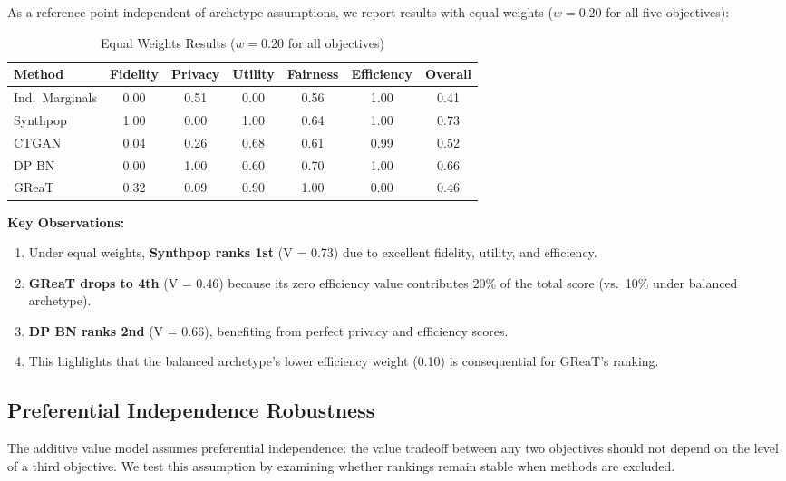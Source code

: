 \documentclass[12pt,a4paper]{article}
\begin{document}
As a reference point independent of archetype assumptions, we report results with equal weights ($w = 0.20$ for all five objectives):

\begin{table}[htbp]
\centering
\caption{Equal Weights Results ($w = 0.20$ for all objectives)}
\label{tab:equal_weights}
\begin{tabular}{@{}lcccccc@{}}
\toprule
\textbf{Method} & \textbf{Fidelity} & \textbf{Privacy} & \textbf{Utility} & \textbf{Fairness} & \textbf{Efficiency} & \textbf{Overall} \\
\midrule
Ind.\ Marginals & 0.00 & 0.51 & 0.00 & 0.56 & 1.00 & 0.41 \\
Synthpop & 1.00 & 0.00 & 1.00 & 0.64 & 1.00 & 0.73 \\
CTGAN & 0.04 & 0.26 & 0.68 & 0.61 & 0.99 & 0.52 \\
DP BN & 0.00 & 1.00 & 0.60 & 0.70 & 1.00 & 0.66 \\
GReaT & 0.32 & 0.09 & 0.90 & 1.00 & 0.00 & 0.46 \\
\bottomrule
\end{tabular}
\end{table}

\textbf{Key Observations:}
\begin{enumerate}
    \item Under equal weights, \textbf{Synthpop ranks 1st} (V = 0.73) due to excellent fidelity, utility, and efficiency.
    \item \textbf{GReaT drops to 4th} (V = 0.46) because its zero efficiency value contributes 20\% of the total score (vs.\ 10\% under balanced archetype).
    \item \textbf{DP BN ranks 2nd} (V = 0.66), benefiting from perfect privacy and efficiency scores.
    \item This highlights that the balanced archetype's lower efficiency weight (0.10) is consequential for GReaT's ranking.
\end{enumerate}

\subsection{Preferential Independence Robustness}

The additive value model assumes preferential independence: the value tradeoff between any two objectives should not depend on the level of a third objective. We test this assumption by examining whether rankings remain stable when methods are excluded.
\end{document}
